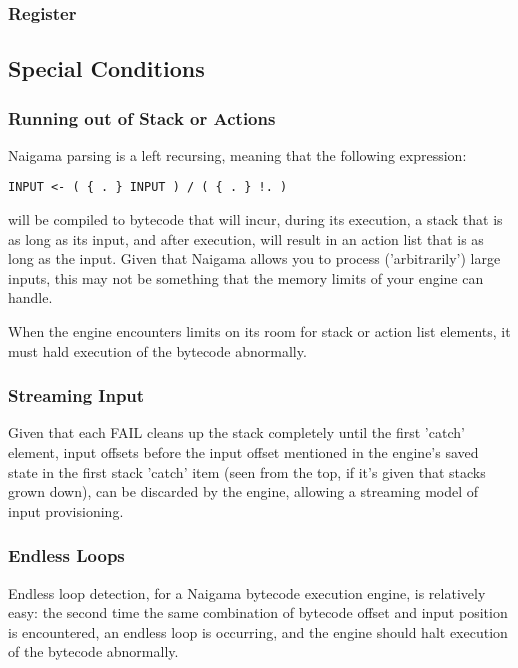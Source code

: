 \subsubsection{Register}

\subsection{Special Conditions}

\subsubsection{Running out of Stack or Actions}

Naigama parsing is a left recursing, meaning that the following
expression:

\begin{myquote}
\begin{verbatim}
INPUT <- ( { . } INPUT ) / ( { . } !. )

\end{verbatim}
\end{myquote}

will be compiled to bytecode that will incur, during its execution,
a stack that is as long as its input, and after execution, will result
in an action list that is as long as the input. Given that Naigama
allows you to process ('arbitrarily') large inputs, this may not
be something that the memory limits of your engine can handle.

When the engine encounters limits on its room for stack or action
list elements, it must hald execution of the bytecode abnormally.

\subsubsection{Streaming Input}

Given that each FAIL cleans up the stack completely until the first
'catch' element, input offsets before the input offset mentioned in the
engine's saved state in the first stack 'catch' item (seen from the top,
if it's given that stacks grown down), can be discarded by the engine,
allowing a streaming model of input provisioning.

\subsubsection{Endless Loops}

Endless loop detection, for a Naigama bytecode execution engine, is
relatively easy: the second time the same combination of bytecode offset
and input position is encountered, an endless loop is occurring, and the
engine should halt execution of the bytecode abnormally.

